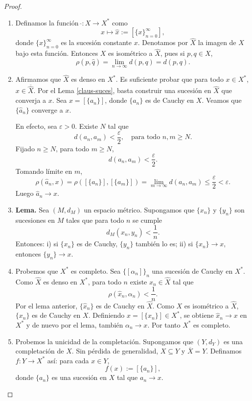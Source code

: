\begin{proof}
\begin{enumerate}
    \item Definamos la función $\,\hat{}:X\to X^*$ como
    \[
    x\mapsto \hat{x}:=[\{x\}_{n=0}^{\infty}],
    \]
    donde $\{x\}_{n=0}^{\infty}$ es la sucesión constante $x$. Denotamos por $\hat{X}$ la imagen de $X$ bajo esta función.
    Entonces $X$ es isométrico a $\hat{X}$, pues si $p,q\in X$,
    \[
    \rho(\hat{p},\hat{q})=\lim_{n\to\infty} d(p,q)=d(p,q).
    \]

    \item Afirmamos que $\hat{X}$ es denso en $X^*$. Es suficiente probar que para todo $x\in X^*$, $x\in\overline{\hat{X}}$. Por el Lema \ref{claus-suces}, basta construir una sucesión en $\hat{X}$ que converja a $x$. Sea $x=[\{a_n\}]$, donde $\{a_n\}$ es de Cauchy en $X$. Veamos que $\{\hat{a}_n\}$ converge a $x$.

    En efecto, sea $\varepsilon>0$. Existe $N$ tal que
    \[
    d(a_n,a_m)<\frac{\varepsilon}{2},\quad \text{para todo } n,m\ge N.
    \]
    Fijado $n\ge N$, para todo $m\ge N$,
    \[
    d(a_n,a_m)<\frac{\varepsilon}{2}.
    \]
    Tomando límite en $m$,
    \[
    \rho(\hat{a}_n,x)=\rho([\{a_n\}],[\{a_m\}])=\lim_{m\to\infty}d(a_n,a_m)\le\frac{\varepsilon}{2}<\varepsilon.
    \]
    Luego $\hat{a}_n\to x$.

    \item \textbf{Lema.} Sea $(M,d_M)$ un espacio métrico. Supongamos que $\{x_n\}$ y $\{y_n\}$ son sucesiones en $M$ tales que para todo $n$ se cumple
    \[
    d_M(x_n,y_n)<\frac{1}{n}.
    \]
    Entonces: i) si $\{x_n\}$ es de Cauchy, $\{y_n\}$ también lo es; ii) si $\{x_n\}\to x$, entonces $\{y_n\}\to x$.

    \item Probemos que $X^*$ es completo. Sea $\{[\alpha_n]\}_n$ una sucesión de Cauchy en $X^*$. Como $\hat{X}$ es denso en $X^*$, para todo $n$ existe $\hat{x}_n\in\hat{X}$ tal que
    \[
    \rho(\hat{x}_n,\alpha_n)<\frac{1}{n}.
    \]
    Por el lema anterior, $\{\hat{x}_n\}$ es de Cauchy en $\hat{X}$. Como $X$ es isométrico a $\hat{X}$, $\{x_n\}$ es de Cauchy en $X$. Definiendo $x=[\{x_n\}]\in X^*$, se obtiene $\hat{x}_n\to x$ en $X^*$ y de nuevo por el lema, también $\alpha_n\to x$. Por tanto $X^*$ es completo.

    \item Probemos la unicidad de la completación. Supongamos que $(Y,d_Y)$ es una completación de $X$. Sin pérdida de generalidad, $X\subseteq Y$ y $\overline{X}=Y$. Definamos $f:Y\to X^*$ así: para cada $x\in Y$,
    \[
    f(x):=[\{a_n\}],
    \]
    donde $\{a_n\}$ es una sucesión en $X$ tal que $a_n\to x$.


\end{enumerate}
\end{proof}
